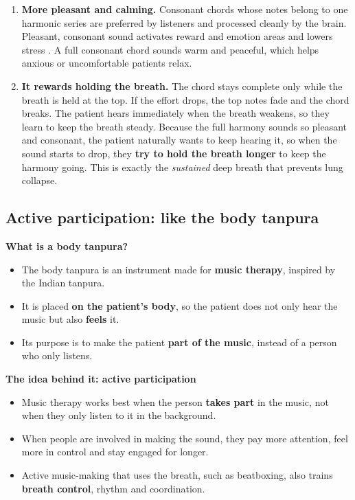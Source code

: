 \documentclass[12pt,a4paper]{article}
\begin{document}
\begin{enumerate}
  \item \textbf{More pleasant and calming.} Consonant chords whose notes belong to one harmonic series are preferred by listeners and processed cleanly by the brain. Pleasant, consonant sound activates reward and emotion areas and lowers stress \cite{dewitte}. A full consonant chord sounds warm and peaceful, which helps anxious or uncomfortable patients relax.
  \item \textbf{It rewards holding the breath.} The chord stays complete only while the breath is held at the top. If the effort drops, the top notes fade and the chord breaks. The patient hears immediately when the breath weakens, so they learn to keep the breath steady. Because the full harmony sounds so pleasant and consonant, the patient naturally wants to keep hearing it, so when the sound starts to drop, they \textbf{try to hold the breath longer} to keep the harmony going. This is exactly the \emph{sustained} deep breath that prevents lung collapse.
\end{enumerate}

\subsection{Active participation: like the body tanpura}
\label{sec:participation}
\textbf{What is a body tanpura?}
\begin{itemize}
  \item The body tanpura is an instrument made for \textbf{music therapy}, inspired by the Indian tanpura.
  \item It is placed \textbf{on the patient's body}, so the patient does not only hear the music but also \textbf{feels} it.
  \item Its purpose is to make the patient \textbf{part of the music}, instead of a person who only listens.
\end{itemize}

\textbf{The idea behind it: active participation}
\begin{itemize}
  \item Music therapy works best when the person \textbf{takes part} in the music, not when they only listen to it in the background.
  \item When people are involved in making the sound, they pay more attention, feel more in control and stay engaged for longer.
  \item Active music-making that uses the breath, such as beatboxing, also trains \textbf{breath control}, rhythm and coordination.
\end{itemize}
\end{document}
